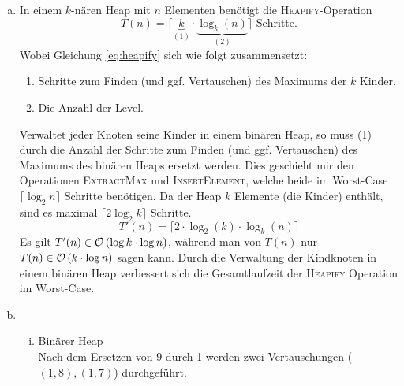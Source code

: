 \documentclass[a4paper]{scrartcl}
\begin{document}
\begin{enumerate}[(a)]
    \item
        In einem $k$-nären Heap mit $n$ Elementen benötigt die
        \textsc{Heapify}-Operation
        \begin{equation}
            \label{eq:heapify}
            T(n) = \Big\lceil \underbrace{k}_{(1)} \cdot \underbrace{\log_k (n)}_{(2)} \Big\rceil
            \text{ Schritte.}
        \end{equation}
        Wobei Gleichung \eqref{eq:heapify} sich wie folgt zusammensetzt:
        \begin{enumerate}[(1)]
            \item Schritte zum Finden (und ggf. Vertauschen) des Maximums der
                $k$ Kinder.
            \item Die Anzahl der Level.
        \end{enumerate}
        Verwaltet jeder Knoten seine Kinder in einem binären Heap, so muss (1)
        durch die Anzahl der Schritte zum Finden (und ggf. Vertauschen) des
        Maximums des binären Heaps ersetzt werden.
        Dies geschieht mir den Operationen \textsc{ExtractMax} und
        \textsc{InsertElement}, welche beide im Worst-Case $\lceil \log_2 n \rceil$ Schritte
        benötigen.
        Da der Heap $k$ Elemente (die Kinder) enthält, sind es maximal
        $\lceil 2 \log_2 k\rceil$ Schritte.
        \begin{equation}
            T'(n) = \Big\lceil 2 \cdot \log_2 (k) \cdot \log_k (n) \Big\rceil
        \end{equation}
        Es gilt $T'(n) \in \mathcal{O} \left( \log k \cdot \log n \right)$, während
        man von $T(n)$ nur $T(n) \in \mathcal{O} \left( k \cdot \log n \right)$
        sagen kann.
        Durch die Verwaltung der Kindknoten in einem binären Heap verbessert
        sich die Gesamtlaufzeit der \textsc{Heapify} Operation im Worst-Case.
        

    \item 
        \begin{enumerate}[(i)]
            \item Binärer Heap \\
                Nach dem Ersetzen von 9 durch 1 werden zwei Vertauschungen
                ($(1,8), (1,7)$) durchgeführt. 


\end{enumerate}
\end{enumerate}
\end{document}
